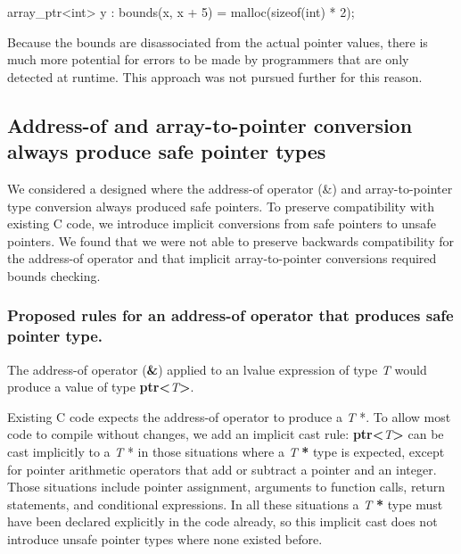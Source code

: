 \documentclass[]{article}
\begin{document}
array\_ptr\textless{}int\textgreater{} y : bounds(x, x + 5) =
malloc(sizeof(int) * 2);

Because the bounds are disassociated from the actual pointer values,
there is much more potential for errors to be made by programmers that
are only detected at runtime. This approach was not pursued further for
this reason.

\subsection{\texorpdfstring{\protect\hypertarget{ux5fToc437460851}{}{\protect\hypertarget{ux5fToc440445532}{}{\protect\hypertarget{ux5fToc440449314}{}{\protect\hypertarget{ux5fToc440551964}{}{}}}}Address-of
and array-to-pointer conversion always produce safe pointer
types}{Address-of and array-to-pointer conversion always produce safe pointer types}}\label{address-of-and-array-to-pointer-conversion-always-produce-safe-pointer-types}

We considered a designed where the address-of operator (\&) and
array-to-pointer type conversion always produced safe pointers. To
preserve compatibility with existing C code, we introduce implicit
conversions from safe pointers to unsafe pointers. We found that we were
not able to preserve backwards compatibility for the address-of operator
and that implicit array-to-pointer conversions required bounds checking.

\subsubsection{\texorpdfstring{\protect\hypertarget{ux5fToc422907010}{}{\protect\hypertarget{ux5fToc424307739}{}{\protect\hypertarget{ux5fToc426641142}{}{\protect\hypertarget{ux5fToc435435017}{}{\protect\hypertarget{ux5fToc437460852}{}{\protect\hypertarget{ux5fToc440445533}{}{\protect\hypertarget{ux5fToc440449315}{}{\protect\hypertarget{ux5fToc440551965}{}{}}}}}}}}Proposed
rules for an address-of operator that produces safe pointer
type.}{Proposed rules for an address-of operator that produces safe pointer type.}}\label{proposed-rules-for-an-address-of-operator-that-produces-safe-pointer-type.}

The address-of operator (\textbf{\&}) applied to an lvalue expression of
type \emph{T} would produce a value of type
\textbf{ptr\textless{}}\emph{T}\textbf{\textgreater{}}.

Existing C code expects the address-of operator to produce a \emph{T} *.
To allow most code to compile without changes, we add an implicit cast
rule: \textbf{ptr\textless{}}\emph{T}\textbf{\textgreater{}} can be cast
implicitly to a \emph{T} * in those situations where a \emph{T}
\textbf{*} type is expected, except for pointer arithmetic operators
that add or subtract a pointer and an integer. Those situations include
pointer assignment, arguments to function calls, return statements, and
conditional expressions. In all these situations a \emph{T} \textbf{*}
type must have been declared explicitly in the code already, so this
implicit cast does not introduce unsafe pointer types where none existed
before.
\end{document}
